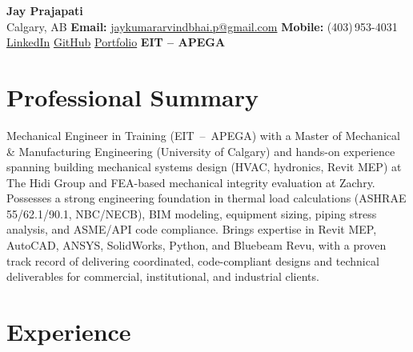 \documentclass[10pt, letterpaper]{article}
\begin{document}
\pagestyle{empty}

\begin{center}
  {\LARGE\textbf{Jay Prajapati}}\\[4pt]
  {\small
    Calgary, AB
    \enspace\textbar\enspace
    \textbf{Email:}
    \href{mailto:jaykumararvindbhai.p@gmail.com}{jaykumararvindbhai.p@gmail.com}
    \enspace\textbar\enspace
    \textbf{Mobile:} (403)\,953-4031
    \enspace\textbar\enspace
    \href{https://linkedin.com/in/jaykumar-prajapati}{LinkedIn}
    \enspace\textbar\enspace
    \href{https://github.com/JayP309}{GitHub}
    \enspace\textbar\enspace
    \href{https://jayp309.github.io/jaykumar-prajapati/}{Portfolio}
    \enspace\textbar\enspace
    \textbf{EIT {--} APEGA}
  }
\end{center}

\vspace{-5pt}
\noindent\hspace*{0.8in}{\color{green}\rule{\dimexpr\linewidth-1.6in\relax}{2.5pt}}
\vspace{4pt}

\section*{Professional Summary}

Mechanical Engineer in Training (EIT~--~APEGA) with a Master of Mechanical \& Manufacturing Engineering (University of Calgary) and hands-on experience spanning building mechanical systems design (HVAC, hydronics, Revit MEP) at The Hidi Group and FEA-based mechanical integrity evaluation at Zachry. Possesses a strong engineering foundation in thermal load calculations (ASHRAE 55/62.1/90.1, NBC/NECB), BIM modeling, equipment sizing, piping stress analysis, and ASME/API code compliance. Brings expertise in Revit MEP, AutoCAD, ANSYS, SolidWorks, Python, and Bluebeam Revu, with a proven track record of delivering coordinated, code-compliant designs and technical deliverables for commercial, institutional, and industrial clients.

\section*{Experience}
\end{document}

